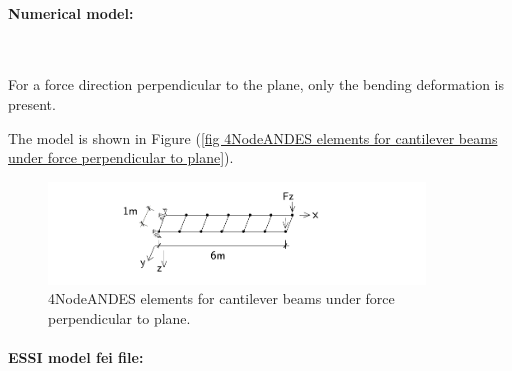 \documentclass[fleqn,11pt]{article}
\begin{document}
\paragraph{Numerical model:} ~

\vskip 12pt

For a force  direction  perpendicular  to  the  plane, only the bending
deformation is present.


The  model is shown  in Figure (\ref{fig 4NodeANDES elements for
cantilever beams under force perpendicular to plane}).

\begin{figure}[!htb]
  \centering
    \centering
    \includegraphics[width=10cm]{../Figure-files/_Chapter_Appendix_Illustrative_Examples/beam_ANDES_xy_bending_6div.pdf}
  \caption{4NodeANDES elements for cantilever beams under force perpendicular to
  plane.}
  \label{fig 4NodeANDES elements for cantilever beams under force perpendicular to plane}
\end{figure}


\paragraph{ESSI model fei file: } ~
\end{document}
